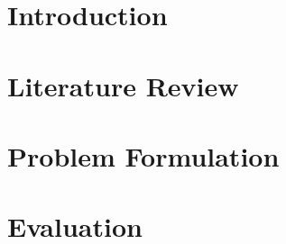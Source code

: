 \documentclass[11pt,a4paper]{article}
\theoremstyle{definition}
\theoremstyle{remark}
\begin{document}
\FloatBarrier


\section{Introduction}
\label{sec:introduction}


\FloatBarrier


\section{Literature Review}
\label{sec:literature}


\FloatBarrier


\section{Problem Formulation}
\label{sec:problem}


\FloatBarrier


\section{Evaluation}
\label{sec:evaluation}


\FloatBarrier


% 
\end{document}
